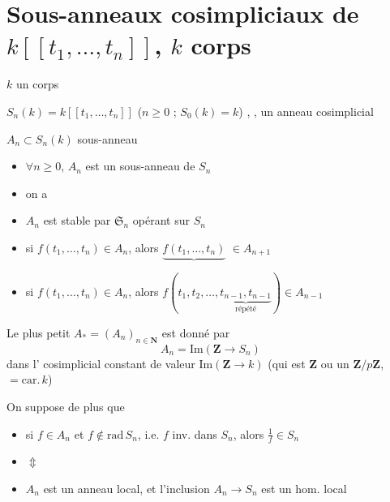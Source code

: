 \documentclass[11pt,a4paper]{article}
\begin{document}
\section{Sous-anneaux cosimpliciaux de $k[[t_1, \ldots, t_n]]$, $k$ corps}



$k$ un  corps

$S_n(k) = k[[t_1, \ldots, t_n]]$ \quad ($n \geq 0$ ; $S_0(k) = k$) \quad
{}, , un anneau cosimplicial

$A_n \subset S_n(k)$ \quad sous-anneau  

\begin{itemize}
  \item[(b)] $\forall n \geq 0$, $A_n$ est un sous-anneau  de $S_n$
  \item[(a)] on a
  \item[a$_1$)] $A_n$ est stable par $\mathfrak{S}_n$ opérant sur $S_n$
  \item[a$_2$)] si $f(t_1, \ldots, t_n) \in A_n$, alors
    $\underbrace{f(t_1, \ldots, t_n)}$ $\in A_{n+1}$
  \item[a$_3$)] si $f(t_1, \ldots, t_n) \in A_n$, alors
    $f(t_1, t_2, \ldots, \underbrace{t_{n-1}, t_{n-1}}_{\text{répété}}) \in A_{n-1}$
\end{itemize}


Le plus petit $A_* = (A_n)_{n \in \mathbf{N}}$ 
 est donné par 
\[
  A_n = \mathrm{Im}(\mathbf{Z} \to S_n)
\]
dans l'  cosimplicial constant de valeur
$\mathrm{Im}(\mathbf{Z} \to k)$ (qui est $\mathbf{Z}$ ou un $\mathbf{Z}/p\mathbf{Z}$,
\struck{\ill{}}  $= \mathrm{car}.\, k$)

On suppose de plus que

\begin{itemize}
  \item[c)] si $f \in A_n$ et $f \notin \mathrm{rad}\, S_n$, i.e. $f$ inv. dans
    $S_n$, alors $\frac{1}{f} \in S_n$
  \item[] $\Updownarrow$
  \item[c$'$)] $A_n$ est un anneau local, et l'inclusion $A_n \to S_n$ est un
    hom. local
\end{itemize}
\end{document}
